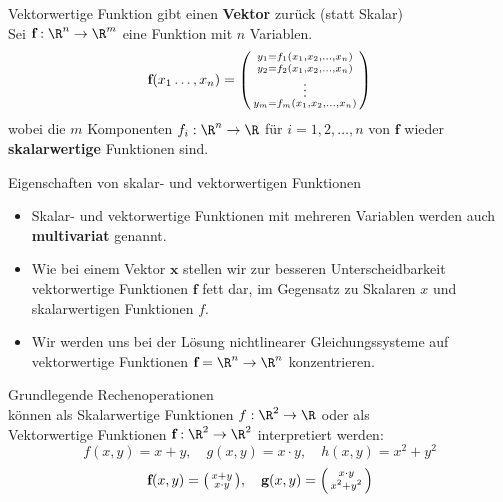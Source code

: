\begin{concept}{Vektorwertige Funktion} gibt einen \textbf{Vektor} zurück (statt Skalar)\\
    Sei $\textbf{f}: \R^n \to \R^m$ eine Funktion mit $n$ Variablen.
    \vspace{-2mm}
    $$\textbf{f}(x_1 \ldots, x_n) = \begin{psmallmatrix} y_1 = f_1(x_1, x_2, \ldots, x_n) \\ y_2 = f_2(x_1, x_2, \ldots, x_n) \\ \vdots \\ y_m = f_m(x_1, x_2, \ldots, x_n) \end{psmallmatrix}$$
    wobei die $m$ Komponenten $f_i: \R^n \to \R$ für $i = 1, 2, \ldots, n$ von $\textbf{f}$ wieder \textbf{skalarwertige} Funktionen sind.
\end{concept}

\begin{corollary}{Eigenschaften von skalar- und vektorwertigen Funktionen}
    \begin{itemize}
        \item Skalar- und vektorwertige Funktionen mit mehreren Variablen werden auch \textbf{multivariat} genannt.
        \item Wie bei einem Vektor $\textbf{x}$ stellen wir zur besseren Unterscheidbarkeit vektorwertige Funktionen $\textbf{f}$ fett dar, im Gegensatz zu Skalaren $x$ und skalarwertigen Funktionen $f$.
        \item Wir werden uns bei der Lösung nichtlinearer Gleichungssysteme auf vektorwertige Funktionen $\textbf{f} = \R^n \to \R^n$ konzentrieren.
    \end{itemize}
\end{corollary}



\begin{example2}{Grundlegende Rechenoperationen} \\
    können als Skalarwertige Funktionen $f: \R^2 \to \R$ oder als \\
    Vektorwertige Funktionen $\textbf{f}: \R^2 \to \R^2$ interpretiert werden:
    $$f(x, y) = x + y, \quad g(x, y) = x \cdot y, \quad h(x, y) = x^2 + y^2$$
    $$\textbf{f}(x, y) = \begin{psmallmatrix} x + y \\ x \cdot y \end{psmallmatrix}, \quad \textbf{g}(x, y) = \begin{psmallmatrix} x \cdot y \\ x^2 + y^2 \end{psmallmatrix}$$
\end{example2}

